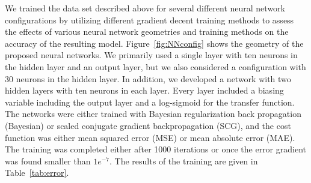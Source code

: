 \documentclass[11pt]{ucthesis}
\begin{document}
We trained the data set described above for several different neural network configurations by utilizing different gradient decent training methods to assess the effects of various neural network geometries and training methods on the accuracy of the resulting model. Figure~\ref{fig:NNconfig} shows the geometry of the proposed neural networks. We primarily used a single layer with ten neurons in the hidden layer and an output layer, but we also considered a configuration with 30 neurons in the hidden layer. In addition, we developed a network with two hidden layers with ten neurons in each layer. Every layer included a biasing variable including the output layer and a log-sigmoid for the transfer function. The networks were either trained with Bayesian regularization back propagation (Bayesian) or scaled conjugate gradient backpropagation (SCG), and the cost function was either mean squared error (MSE) or mean absolute error (MAE). The training was completed either after 1000 iterations or once the error gradient was found smaller than $1e^{-7}$. The results of the training are given in Table~\ref{tab:error}.
\end{document}
